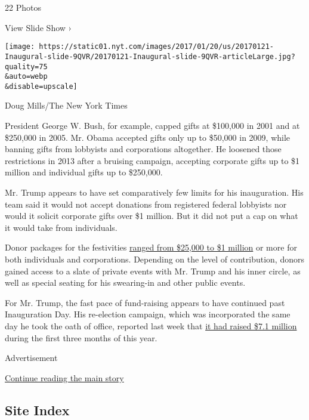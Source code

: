 22 Photos

View Slide Show ›

\texttt{[image: https://static01.nyt.com/images/2017/01/20/us/20170121-Inaugural-slide-9QVR/20170121-Inaugural-slide-9QVR-articleLarge.jpg?quality=75\\\&auto=webp\\\&disable=upscale]}

Doug Mills/The New York Times

President George W. Bush, for example, capped gifts at \$100,000 in 2001
and at \$250,000 in 2005. Mr. Obama accepted gifts only up to \$50,000
in 2009, while banning gifts from lobbyists and corporations altogether.
He loosened those restrictions in 2013 after a bruising campaign,
accepting corporate gifts up to \$1 million and individual gifts up to
\$250,000.

Mr. Trump appears to have set comparatively few limits for his
inauguration. His team said it would not accept donations from
registered federal lobbyists nor would it solicit corporate gifts over
\$1 million. But it did not put a cap on what it would take from
individuals.

Donor packages for the festivities
\href{https://www.nytimes.com/2016/11/29/us/politics/inauguration-donald-trump-president.html}{ranged
from \$25,000 to \$1 million} or more for both individuals and
corporations. Depending on the level of contribution, donors gained
access to a slate of private events with Mr. Trump and his inner circle,
as well as special seating for his swearing-in and other public events.

For Mr. Trump, the fast pace of fund-raising appears to have continued
past Inauguration Day. His re-election campaign, which was incorporated
the same day he took the oath of office, reported last week that
\href{https://www.nytimes.com/2017/04/14/us/politics/trump-raises-millions-for-2020-re-election-bid.html?rref=collection\%2Fbyline\%2Frachel-shorey\&action=click\&contentCollection=undefined\&region=stream\&module=stream_unit\&version=latest\&contentPlacement=1\&pgtype=collection}{it
had raised \$7.1 million} during the first three months of this year.

Advertisement

\protect\hyperlink{after-bottom}{Continue reading the main story}

\hypertarget{site-index}{%
\subsection{Site Index}\label{site-index}}

